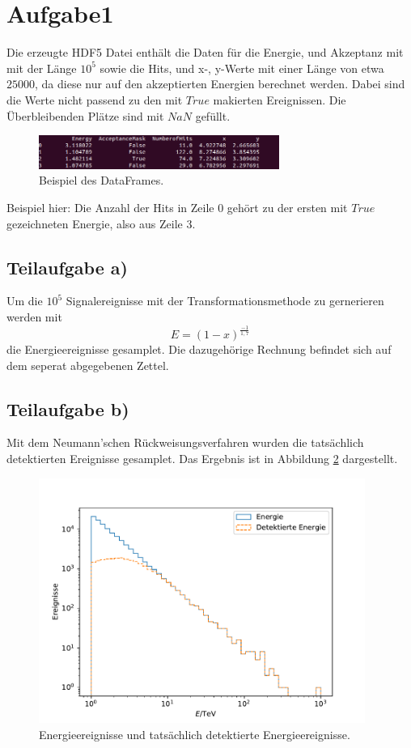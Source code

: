 \section{Aufgabe1}
\label{sec:Aufgabe1}
%
Die erzeugte HDF5 Datei enthält die Daten für die Energie, und Akzeptanz mit
mit der Länge $10^5$ sowie die Hits, und x-, y-Werte mit einer Länge von etwa
$25000$, da diese nur auf den akzeptierten Energien berechnet werden. Dabei sind die
 Werte nicht passend zu den mit $True$ makierten Ereignissen. Die Überbleibenden Plätze
 sind mit $NaN$ gefüllt.
 \begin{figure}[h]
   \centering
   \includegraphics[width=0.7\textwidth]{pics/Terminal.png}
   \caption{Beispiel des DataFrames.}
   \label{fig:Data}
 \end{figure}
  Beispiel hier: Die Anzahl der Hits in Zeile 0 gehört zu der ersten mit $True$
  gezeichneten Energie, also aus Zeile 3.

\subsection{Teilaufgabe a)}
Um die $10^5$ Signalereignisse mit der Transformationsmethode zu gernerieren werden
mit
\begin{equation*}
  E=(1-x)^{\frac{-1}{1,7}}
\end{equation*}
die Energieereignisse gesamplet. Die dazugehörige Rechnung befindet sich auf dem
seperat abgegebenen Zettel.
\subsection{Teilaufgabe b)}
Mit dem Neumann'schen Rückweisungsverfahren wurden die tatsächlich detektierten
Ereignisse gesamplet. Das Ergebnis ist in Abbildung \ref{fig:Energie} dargestellt.
\begin{figure}[h]
  \centering
  \includegraphics[height = 8cm]{plots/Energie.pdf}
  \caption{Energieereignisse und tatsächlich detektierte Energieereignisse.}
  \label{fig:Energie}
\end{figure}
